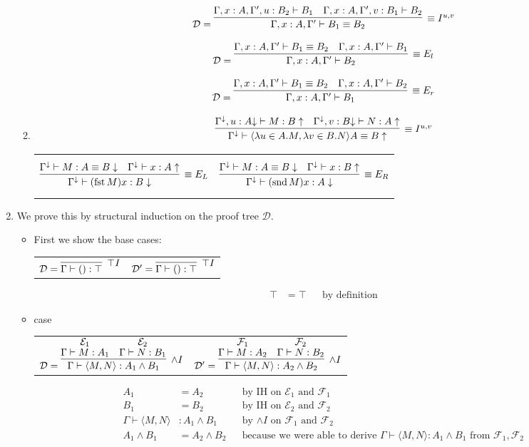 \documentclass{article}
\newcommand{\D}{\mathcal{D}}
\newcommand{\E}{\mathcal{E}}
\newcommand{\F}{\mathcal{F}}
\newcommand{\proves}{\vdash}
\newcommand{\GV}{\Gamma \proves}
\DeclareMathOperator{\fst}{fst}
\DeclareMathOperator{\snd}{snd}
\begin{document}
\begin{enumerate}[label=\textbf{Exercise \arabic*}]
\begin{enumerate}[label=\textbf{Task \arabic*},leftmargin=1em]
$$\D = \infer[\equiv I^{u, v}]
  {\Gamma, x:A, \Gamma' \vdash B_1 \equiv B_2}
  {\Gamma, x:A, \Gamma', u:B_2 \vdash B_1 & \Gamma, x:A, \Gamma', v:B_1 \vdash B_2}
$$

$$\D = \infer[\equiv E_l]
  {\Gamma, x:A, \Gamma' \vdash B_2}
  {\Gamma, x:A, \Gamma' \vdash B_1 \equiv B_2 & \Gamma, x:A, \Gamma' \vdash B_1}
$$

$$\D = \infer[\equiv E_r]
  {\Gamma, x:A, \Gamma' \vdash B_1}
  {\Gamma, x:A, \Gamma' \vdash B_1 \equiv B_2 & \Gamma, x:A, \Gamma' \vdash B_2}
$$

\item 
\[
\infer[\equiv I^{u,v}]
  {\Gamma^\downarrow \proves \langle \lambda u \in A.M,\lambda v \in B.N \rangle A \equiv B \uparrow}
  {\Gamma^\downarrow, u:A {\downarrow} \proves M:B \uparrow
  &\Gamma^\downarrow, v:B {\downarrow} \proves N:A \uparrow}
\]
\begin{tabular}{cc}
$$
\infer[\equiv E_L]
  { \Gamma^\downarrow \proves (\fst M) x : B \downarrow }
  { \Gamma^\downarrow \proves M:A \equiv B \downarrow
  & \Gamma^\downarrow \proves x : A \uparrow }
$$
&
$$
\infer[\equiv E_R]
  { \Gamma^\downarrow \proves (\snd M) x : A \downarrow }
  { \Gamma^\downarrow \proves M:A \equiv B \downarrow
  & \Gamma^\downarrow \proves x : B \uparrow }
$$
\end{tabular}

\end{enumerate}

\item We prove this by structural induction on the proof tree $\mathcal{D}$.

\begin{itemize}
\item First we show the base cases:
\begin{tabular}{cc}
$\D = \infer[\top I]{\GV () : \top}{}$
&
$\D' = \infer[\top I]{\GV () : \top}{}$
\end{tabular}
\begin{align*}
\top &= \top && \text{by definition}
\end{align*}


\item case
\begin{tabular}{cc}
$\D = \infer[\land I]
  {\GV \langle M,N \rangle : A_1 \land B_1}
  {\deduce{\GV M:A_1}{\E_1}
  &\deduce{\GV N:B_1}{\E_2} }$
&
$\D' = \infer[\land I]
  {\GV \langle M,N \rangle : A_2 \land B_2}
  {\deduce{\GV M:A_2}{\F_1}
  &\deduce{\GV N:B_2}{\F_2} }$
\end{tabular}
\begin{align*}
A_1 &= A_2 && \text{by IH on $\E_1$ and $\F_1$} \\
B_1 &= B_2 && \text{by IH on $\E_2$ and $\F_2$} \\
\GV \langle M,N \rangle &: A_1 \land B_1 && \text{by $\land I$ on $\F_1$ and $\F_2$} \\
A_1 \land B_1 &= A_2 \land B_2 && \text{because we were able to derive $\GV \langle M,N \rangle : A_1 \land B_1$ from $\F_1,\F_2$}
\end{align*}



\end{itemize}
\end{enumerate}
\end{document}
